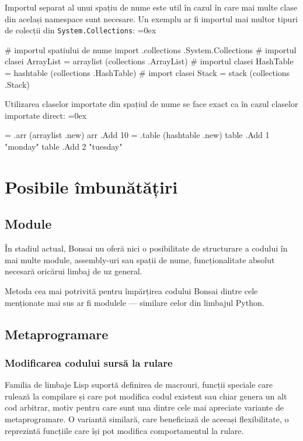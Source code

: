 \documentclass[12pt,a4paper]{memoir}
\renewcommand{\c}{\texttt}
\newenvironment{code}
{
\definecolor{shadecolor}{gray}{0.91}
\topsep=0ex
\relax
\shaded
\verbatim
}
{
\endverbatim
\endshaded
}
\begin{document}
Importul separat al unui spațiu de nume este util în cazul în care mai multe clase din același namespace sunt necesare. Un exemplu ar fi importul mai multor tipuri de colecții din \c{System.Collections}:
\begin{code}
# importul spatiului de nume 
import .collections .System.Collections
# importul clasei ArrayList
= arraylist (collections .ArrayList)
# importul clasei HashTable
= hashtable (collections .HashTable)
# import clasei Stack
= stack (collections .Stack)
\end{code}

Utilizarea claselor importate din spațiul de nume se face exact ca în cazul claselor importate direct:
\begin{code}
= .arr (arraylist .new)
arr .Add 10
= .table (hashtable .new)
table .Add 1 "monday"
table .Add 2 "tuesday"
\end{code}

\chapter{Posibile îmbunătățiri}

\section{Module}

În stadiul actual, Bonsai nu oferă nici o posibilitate de structurare a codului în mai multe module, assembly-uri sau spații de nume, funcționalitate absolut necesară oricărui limbaj de uz general.

Metoda cea mai potrivită pentru împărțirea codului Bonsai dintre cele menționate mai sus ar fi modulele — similare celor din limbajul Python. 

\section{Metaprogramare}

\subsection{Modificarea codului sursă la rulare} 

Familia de limbaje Lisp suportă definirea de macrouri, funcții speciale care rulează la compilare și care pot modifica codul existent sau chiar genera un alt cod arbitrar, motiv pentru care sunt una dintre cele mai apreciate variante de metaprogramare. O variantă similară, care beneficiază de aceeași flexibilitate, o reprezintă funcțiile care își pot modifica comportamentul la rulare. 
\end{document}
